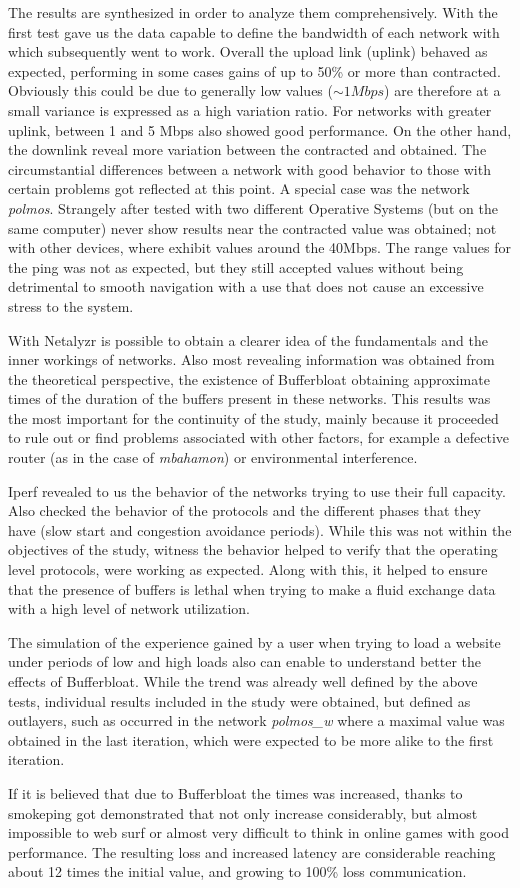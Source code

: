 The results are synthesized in order to analyze them comprehensively. With
the first test gave us the data capable to define the bandwidth of each
network with which subsequently went to work. Overall the upload link (uplink)
behaved as expected, performing in some cases gains of up to 50\% or more than
contracted. Obviously this could be due to generally low values ($\sim1Mbps$)
are therefore at a small variance is expressed as a high variation ratio. For
networks with greater uplink, between 1 and 5 Mbps also showed good
performance. On the other hand, the downlink reveal more variation between the
contracted and obtained. The circumstantial differences between a network with
good behavior to those with certain problems got reflected at this point. A
special case was the network \textit{polmos}. Strangely after tested with two
different Operative Systems (but on the same computer) never show results near
the contracted value was obtained; not with other devices, where exhibit
values around the 40Mbps. The range values for the ping was not as expected,
but they still accepted values without being detrimental to smooth navigation
with a use that does not cause an excessive stress to the system.

With Netalyzr is possible to obtain a clearer idea of the fundamentals and the
inner workings of networks. Also most revealing information was obtained from
the theoretical perspective, the existence of Bufferbloat obtaining
approximate times of the duration of the buffers present in these networks.
This results was the most important for the continuity of the study, mainly
because it proceeded to rule out or find problems associated with other
factors, for example a defective router (as in the case of \textit{mbahamon})
or environmental interference.

Iperf revealed to us the behavior of the networks trying to use their full
capacity. Also checked the behavior of the protocols and the different phases
that they have (slow start and congestion avoidance periods). While this was
not within the objectives of the study, witness the behavior helped to verify
that the operating level protocols, were working as expected. Along with this,
it helped to ensure that the presence of buffers is lethal when trying to make
a fluid exchange data with a high level of network utilization.

The simulation of the experience gained by a user when trying to load a
website under periods of low and high loads also can enable to understand
better the effects of Bufferbloat. While the trend was already well defined by
the above tests, individual results included in the study were obtained, but
defined as outlayers, such as occurred in the network \textit{polmos\_w} where
a maximal value was obtained in the last iteration, which were expected  to be
more alike to the first iteration.

If it is believed that due to Bufferbloat the times was increased, thanks to
smokeping got demonstrated that not only increase considerably, but almost
impossible to web surf or almost very difficult to think in online games with
good performance. The resulting loss and increased latency are considerable
reaching about 12 times the initial value, and growing to 100\% loss
communication.
